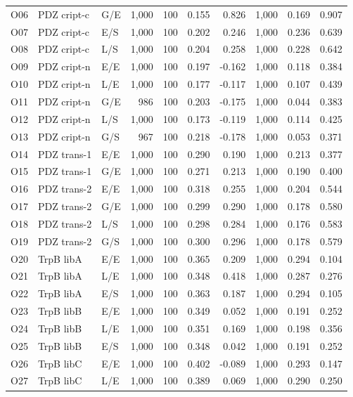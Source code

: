 \begin{longtable}[c]{lllrrrrrrr}
O06 & PDZ cript-c & G/E & 1,000 & 100 & 0.155 & 0.826 & 1,000 & 0.169 & 0.907 \\
O07 & PDZ cript-c & E/S & 1,000 & 100 & 0.202 & 0.246 & 1,000 & 0.236 & 0.639 \\
O08 & PDZ cript-c & L/S & 1,000 & 100 & 0.204 & 0.258 & 1,000 & 0.228 & 0.642 \\
O09 & PDZ cript-n & E/E & 1,000 & 100 & 0.197 & -0.162 & 1,000 & 0.118 & 0.384 \\
O10 & PDZ cript-n & L/E & 1,000 & 100 & 0.177 & -0.117 & 1,000 & 0.107 & 0.439 \\
O11 & PDZ cript-n & G/E & 986 & 100 & 0.203 & -0.175 & 1,000 & 0.044 & 0.383 \\
O12 & PDZ cript-n & L/S & 1,000 & 100 & 0.173 & -0.119 & 1,000 & 0.114 & 0.425 \\
O13 & PDZ cript-n & G/S & 967 & 100 & 0.218 & -0.178 & 1,000 & 0.053 & 0.371 \\
O14 & PDZ trans-1 & E/E & 1,000 & 100 & 0.290 & 0.190 & 1,000 & 0.213 & 0.377 \\
O15 & PDZ trans-1 & G/E & 1,000 & 100 & 0.271 & 0.213 & 1,000 & 0.190 & 0.400 \\
O16 & PDZ trans-2 & E/E & 1,000 & 100 & 0.318 & 0.255 & 1,000 & 0.204 & 0.544 \\
O17 & PDZ trans-2 & G/E & 1,000 & 100 & 0.299 & 0.290 & 1,000 & 0.178 & 0.580 \\
O18 & PDZ trans-2 & L/S & 1,000 & 100 & 0.298 & 0.284 & 1,000 & 0.176 & 0.583 \\
O19 & PDZ trans-2 & G/S & 1,000 & 100 & 0.300 & 0.296 & 1,000 & 0.178 & 0.579 \\
O20 & TrpB libA & E/E & 1,000 & 100 & 0.365 & 0.209 & 1,000 & 0.294 & 0.104 \\
O21 & TrpB libA & L/E & 1,000 & 100 & 0.348 & 0.418 & 1,000 & 0.287 & 0.276 \\
O22 & TrpB libA & E/S & 1,000 & 100 & 0.363 & 0.187 & 1,000 & 0.294 & 0.105 \\
O23 & TrpB libB & E/E & 1,000 & 100 & 0.349 & 0.052 & 1,000 & 0.191 & 0.252 \\
O24 & TrpB libB & L/E & 1,000 & 100 & 0.351 & 0.169 & 1,000 & 0.198 & 0.356 \\
O25 & TrpB libB & E/S & 1,000 & 100 & 0.348 & 0.042 & 1,000 & 0.191 & 0.252 \\
O26 & TrpB libC & E/E & 1,000 & 100 & 0.402 & -0.089 & 1,000 & 0.293 & 0.147 \\
O27 & TrpB libC & L/E & 1,000 & 100 & 0.389 & 0.069 & 1,000 & 0.290 & 0.250 \\

\end{longtable}
